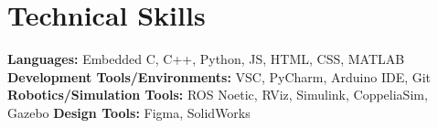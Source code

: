 \section*{Technical Skills}
%
%
%
\begin{tasks}
  \task \textbf{Languages:} Embedded C, C++, Python, JS, HTML, CSS, MATLAB
  \task \textbf{Development Tools/Environments:} VSC, PyCharm, Arduino IDE, Git
  \task \textbf{Robotics/Simulation Tools:} ROS Noetic, RViz, Simulink, CoppeliaSim, Gazebo
  \task \textbf{Design Tools:} Figma, SolidWorks
\end{tasks}